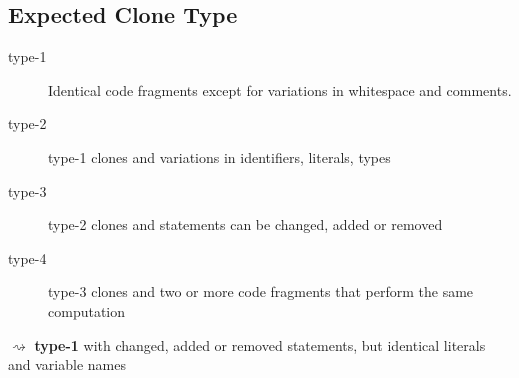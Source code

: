 \subsection{Expected Clone Type}
\begin{frame}{\insertsubsection}
	\begin{description}
		\item [type-1] Identical code fragments except for variations in whitespace and comments.
		\item [type-2] type-1 clones and variations in identifiers, literals, types
		\item [type-3] type-2 clones and statements can be changed, added or removed
		\item [type-4] type-3 clones and two or more code fragments that perform the same computation
	\end{description}
	\pause
	\begin{center}
		$\rightsquigarrow$ \textbf{type-1} with changed, added or removed statements, but identical literals and variable names
	\end{center}
\end{frame}